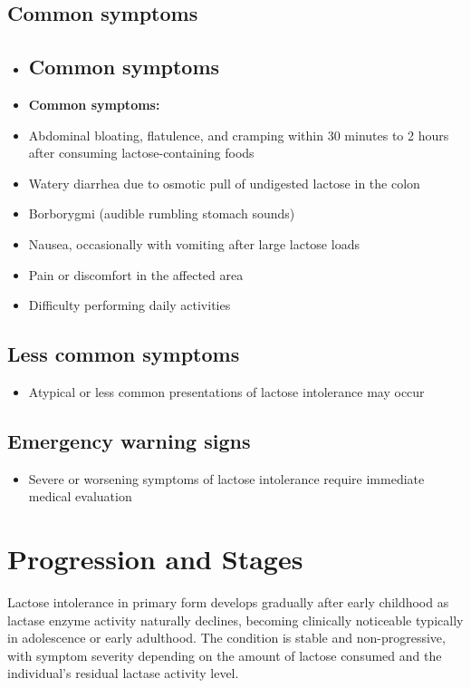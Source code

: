 \subsection{Common symptoms}
\begin{itemize}[noitemsep]
  \item \subsection{Common symptoms}
  \item \textbf{Common symptoms:}
  \item Abdominal bloating, flatulence, and cramping within 30 minutes to 2 hours after consuming lactose-containing foods
  \item Watery diarrhea due to osmotic pull of undigested lactose in the colon
  \item Borborygmi (audible rumbling stomach sounds)
  \item Nausea, occasionally with vomiting after large lactose loads
  \item Pain or discomfort in the affected area
  \item Difficulty performing daily activities
\end{itemize}

\subsection{Less common symptoms}
\begin{itemize}[noitemsep]
  \item Atypical or less common presentations of lactose intolerance may occur
\end{itemize}

\subsection{Emergency warning signs}
\begin{itemize}[noitemsep]
  \item Severe or worsening symptoms of lactose intolerance require immediate medical evaluation
\end{itemize}
\section{Progression and Stages}
Lactose intolerance in primary form develops gradually after early childhood as lactase enzyme activity naturally declines, becoming clinically noticeable typically in adolescence or early adulthood. The condition is stable and non-progressive, with symptom severity depending on the amount of lactose consumed and the individual's residual lactase activity level.

